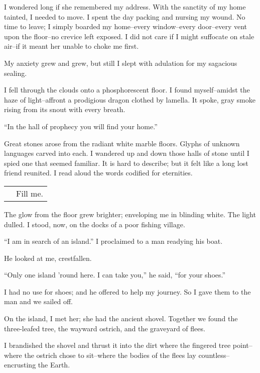 \documentclass{article}
\begin{document}
I wondered long if she remembered my address.
With the sanctity of my home tainted, I needed to move.
I spent the day packing and nursing my wound.
No time to leave; I simply boarded my home--every
window--every door--every vent upon the floor--no
crevice left exposed.
I did not care if I might suffocate on stale air--if
it meant her unable to choke me first.


My anxiety grew and grew, but still I slept
with adulation for my sagacious sealing.
\vvvv


\noindent
I fell through the clouds onto a phosphorescent floor.
I found myself--amidst the haze of light--affront
a prodigious dragon clothed by lamella. %
It spoke, gray smoke rising from its snout with every breath.
\VV


``In the hall of prophecy you will find your home.''
\VV


\noindent
Great stones arose from the radiant white marble floors.
Glyphs of unknown languages carved into each.
I wandered up and down those halls of stone
until I spied one that seemed familiar.
It is hard to describe; but it felt like a long lost friend
reunited.  I read aloud the words codified for eternities.
\VV


\begin{tabular}{ll}
& Fill me. \\
\end{tabular}
\vspace*{3ex}


\noindent
The glow from the floor grew brighter;
enveloping me in blinding white.
The light dulled.
I stood, now, on the docks of a poor fishing village.
\VV


``I am in search of an island.''
I proclaimed to a man readying his boat.
\VV


\noindent
He looked at me, crestfallen.
\VV


``Only one island 'round here.
I can take you,'' he said, ``for your shoes.''
\VV


\noindent
I had no use for shoes; and he offered to help my journey.
So I gave them to the man and we sailed off.


On the island, I met her; she had the ancient shovel.
Together we found the three-leafed tree, the
wayward ostrich, and the graveyard of flees.


I brandished the shovel and thrust it into the dirt
where the fingered tree point--where the ostrich
chose to sit--where the bodies of the flees lay
countless--encrusting the Earth.
\end{document}
